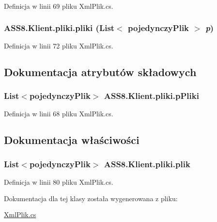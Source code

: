 Definicja w linii 69 pliku XmlPlik.cs.\hypertarget{a00017_b0ec2c54e1e801cd2f2d5dd2931a821a}{
\subsubsection[{pliki}]{\setlength{\rightskip}{0pt plus 5cm}ASS8.Klient.pliki.pliki (List$<$ {\bf pojedynczyPlik} $>$ {\em p})}}
\label{d4/d51/a00017_b0ec2c54e1e801cd2f2d5dd2931a821a}




Definicja w linii 72 pliku XmlPlik.cs.

\subsection{Dokumentacja atrybutów składowych}
\hypertarget{a00017_5017b8df3b1260060437b0a9a637cd09}{
\subsubsection[{pPliki}]{\setlength{\rightskip}{0pt plus 5cm}List$<${\bf pojedynczyPlik}$>$ {\bf ASS8.Klient.pliki.pPliki}}}
\label{d4/d51/a00017_5017b8df3b1260060437b0a9a637cd09}




Definicja w linii 68 pliku XmlPlik.cs.

\subsection{Dokumentacja właściwości}
\hypertarget{a00017_0c7041e93f82e3c8ef7d6620292f7053}{
\subsubsection[{plik}]{\setlength{\rightskip}{0pt plus 5cm}List$<${\bf pojedynczyPlik}$>$ ASS8.Klient.pliki.plik}}
\label{d4/d51/a00017_0c7041e93f82e3c8ef7d6620292f7053}




Definicja w linii 80 pliku XmlPlik.cs.

Dokumentacja dla tej klasy została wygenerowana z pliku:\begin{CompactItemize}
\item 
\hyperlink{a00054}{XmlPlik.cs}\end{CompactItemize}
